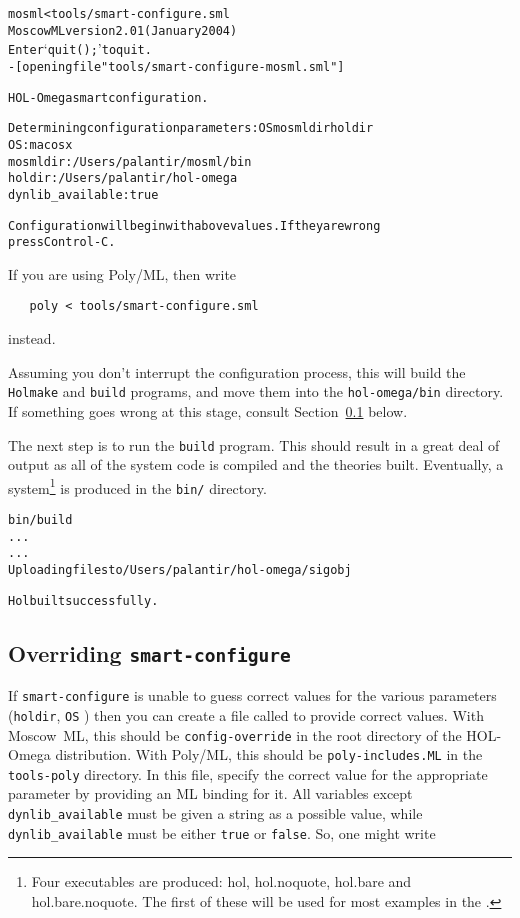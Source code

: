 \begin{session}
\begin{alltt}
\dol mosml < tools/smart-configure.sml
Moscow ML version 2.01 (January 2004)
Enter `quit();' to quit.
- [opening file "tools/smart-configure-mosml.sml"]

HOL-Omega smart configuration.

Determining configuration parameters: OS mosmldir holdir
OS:                 macosx
mosmldir:           /Users/palantir/mosml/bin
holdir:             /Users/palantir/hol-omega
dynlib_available:   true

Configuration will begin with above values.  If they are wrong
press Control-C.
\end{alltt}
\end{session}

If you are using Poly/ML, then write
\begin{verbatim}
   poly < tools/smart-configure.sml
\end{verbatim}
instead.

Assuming you don't interrupt the configuration process, this will
build the \texttt{Holmake} and \texttt{build} programs, and move them
into the \texttt{hol-omega/bin} directory.  If something goes wrong at this
stage, consult Section~\ref{sec:editting-configure} below.

The next step is to run the \texttt{build} program.  This should
result in a great deal of output as all of the system code is compiled
and the theories built.  Eventually, a \HOLW{} system\footnote{Four
  \HOLW{} executables are produced: \textsf{hol}, \textsf{hol.noquote},
  \textsf{hol.bare} and \textsf{hol.bare.noquote}.  The first of these
  will be used for most examples in the \TUTORIAL{}.} is produced in
the \texttt{bin/} directory.

\begin{session}
\begin{alltt}
\dol bin/build
  ...
  ...
Uploading files to /Users/palantir/hol-omega/sigobj

Hol built successfully.
\dol
\end{alltt}
\end{session}


\subsection{Overriding \texttt{smart-configure}}
\label{sec:editting-configure}

If \texttt{smart-configure} is unable to guess correct values for the
various parameters (\texttt{holdir}, \texttt{OS} \etc) then you can
create a file called to provide correct values.  With Moscow~ML, this
should be \texttt{config-override} in the root directory of the HOL-Omega
distribution.  With Poly/ML, this should be \texttt{poly-includes.ML}
in the \texttt{tools-poly} directory. In this file, specify the
correct value for the appropriate parameter by providing an ML binding
for it.  All variables except \texttt{dynlib\_available} must be given
a string as a possible value, while \texttt{dynlib\_available} must be
either \texttt{true} or \texttt{false}.  So, one might write

